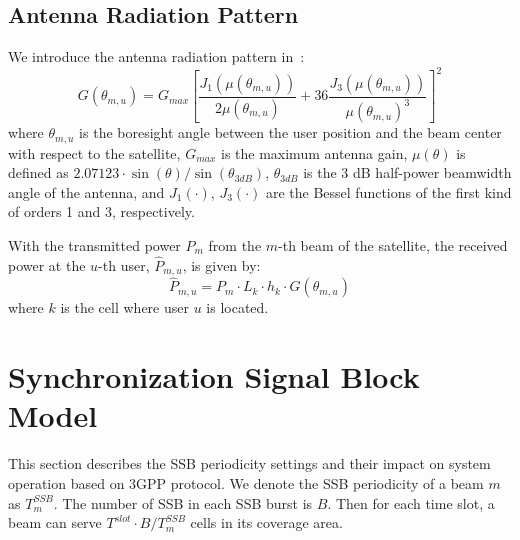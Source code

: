 \subsection{Antenna Radiation Pattern}
We introduce the antenna radiation pattern in~\cite{Energy-Efficient}:
\begin{equation}
    G(\theta_{m,u}) = G_{max} \left[ \frac{J_1\left(\mu(\theta_{m,u})\right)}{2\mu(\theta_{m,u})}
    + 36 \frac{J_3\left(\mu(\theta_{m,u})\right)}{\mu(\theta_{m,u})^3} \right]^2
\end{equation}
where $\theta_{m,u}$ is the boresight angle between the user position and the beam center with respect to the satellite, $G_{max}$ is the maximum antenna gain, $\mu(\theta)$ is defined as $2.07123 \cdot \sin(\theta)/\sin(\theta_{3dB})$, $\theta_{3dB}$ is the 3 dB half-power beamwidth angle of the antenna, and $J_1(\cdot)$, $J_3(\cdot)$ are the Bessel functions of the first kind of orders 1 and 3, respectively.

With the transmitted power $P_{m}$ from the $m$-th beam of the satellite, the received power at the $u$-th user, $\hat{P}_{m,u}$, is given by:
\begin{equation}
    \hat{P}_{m,u} = P_{m} \cdot L_{k} \cdot h_{k} \cdot G(\theta_{m,u})
\end{equation}
where $k$ is the cell where user $u$ is located.

\section{Synchronization Signal Block Model}

This section describes the SSB periodicity settings and their impact on system operation based on 3GPP protocol. We denote the SSB periodicity of a beam $m$ as $T^{SSB}_m$. The number of SSB in each SSB burst is $B$. Then for each time slot, a beam can serve $T^{slot} \cdot B / T^{SSB}_m$ cells in its coverage area.




